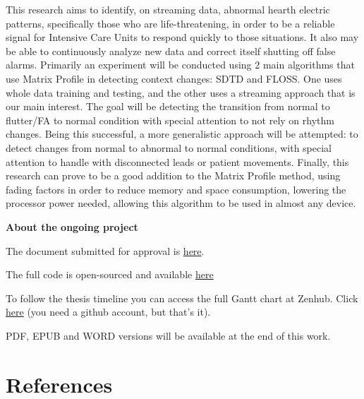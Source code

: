 \documentclass[12pt,twoside]{fmupthesis}
\begin{document}
This research aims to identify, on streaming data, abnormal hearth electric patterns, specifically those who are
life-threatening, in order to be a reliable signal for Intensive Care Units to respond quickly to those situations. It
also may be able to continuously analyze new data and correct itself shutting off false alarms. Primarily an experiment
will be conducted using 2 main algorithms that use Matrix Profile in detecting context changes: SDTD and FLOSS. One uses
whole data training and testing, and the other uses a streaming approach that is our main interest. The goal will be
detecting the transition from normal to flutter/FA to normal condition with special attention to not rely on rhythm
changes. Being this successful, a more generalistic approach will be attempted: to detect changes from normal to
abnormal to normal conditions, with special attention to handle with disconnected leads or patient movements. Finally,
this research can prove to be a good addition to the Matrix Profile method, using fading factors in order to reduce
memory and space consumption, lowering the processor power needed, allowing this algorithm to be used in almost any
device.

\textbf{About the ongoing project}

The document submitted for approval is
\href{https://github.com/franzbischoff/false.alarm/blob/master/protocol/Protocol.pdf}{here}.

The full code is open-sourced and available \href{https://github.com/franzbischoff/false.alarm/}{here}

To follow the thesis timeline you can access the full Gantt chart at Zenhub. Click
\href{https://app.zenhub.com/workspaces/phd-thesis-5eb2ce34f5f30b3aed0a35af/roadmap}{here} (you need a github account, but
that's it).

PDF, EPUB and WORD versions will be available at the end of this work.

\backmatter

\hypertarget{references}{%
\chapter*{References}\label{references}}


\noindent

\setlength{\parindent}{-0.20in}
\setlength{\leftskip}{0.20in}
\setlength{\parskip}{8pt}
\end{document}
